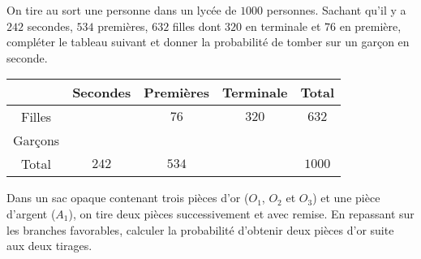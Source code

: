 \documentclass{article}
\begin{document}
\begin{minipage}{0.45\textwidth}
\begin{example}
On tire au sort une personne dans un lycée de $1000$ personnes. Sachant qu'il y a $242$ secondes, $534$ premières, $632$ filles dont $320$ en terminale et $76$ en première, compléter le tableau suivant et donner la probabilité de tomber sur un garçon en seconde.
\begin{center}
\begin{tabular}{|c|c|c|c|c|}
\hline
            &Secondes   &Premières  &Terminale  &Total\\
\hline
Filles      &           &$76$       &$320$      &$632$\\
\hline
Garçons     &           &           &           &\\
\hline
Total       &$242$      &$534$      &           &$1000$\\
\hline
\end{tabular}
\end{center}
\emptybox{3cm} 
\end{example}
\end{minipage}
\hfill\vline\hfill
\begin{minipage}{0.45\textwidth}
\begin{example}
Dans un sac opaque contenant trois pièces d'or ($O_1$, $O_2$ et $O_3$) et une pièce d'argent ($A_1$), on tire deux pièces successivement et avec remise. En repassant sur les branches favorables, calculer la probabilité d'obtenir deux pièces d'or suite aux deux tirages.
\begin{center}
    
\end{center}
\emptybox{3cm}
\end{example}
\end{minipage}
\newpage
\end{document}

